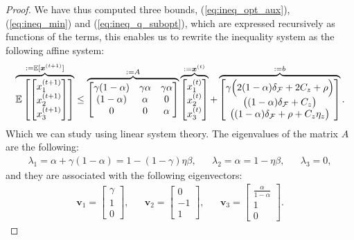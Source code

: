 \begin{proof}
    We have thus computed three bounds, (\ref{eq:ineq_opt_aux}), (\ref{eq:ineq_min}) and (\ref{eq:ineq_q_subopt}), which are expressed recursively as functions of the terms,
    this enables us to rewrite the inequality system as the following affine system:
    \begin{align}
        \label{eq:affine_system}
        \overbrace{ \mathbb{E} \begin{bmatrix}\begin{bmatrix}
            x_1^{(t+1)}\\
            x_2^{(t+1)}\\
            x_3^{(t+1)} 
        \end{bmatrix} \end{bmatrix} }^{:=\mathbb{E}[\bm{x}^{(t+1)}]}
        \leq 
        \overbrace{
            \begin{bmatrix}
                \gamma (1-\alpha) & \gamma \alpha &  \gamma \alpha \\
                 (1-\alpha) & \alpha & 0 \\
                 0 & 0 & \alpha 
            \end{bmatrix}
            }^{:=A}
        \overbrace{\begin{bmatrix}
            x_1^{(t)}\\
            x_2^{(t)}\\
            x_3^{(t)}
        \end{bmatrix}}^{:=\bm{x}^{(t)}}+
        \overbrace{
        \begin{bmatrix}
            \gamma \Bigl(  2(1-\alpha)\delta_\mathcal{F}+2C_z +\rho \Bigr)\\
            \bigl( (1-\alpha) \delta_\mathcal{F} + C_z\bigr) \\
            \bigl((1-\alpha) \delta_\mathcal{F} + \rho + C_z \eta_z \bigr)
        \end{bmatrix}}^{:=b}.
    \end{align}
    Which we can study using linear system theory. The eigenvalues of the matrix $A$ are the following:
    \begin{align*}
        \lambda_1 = \alpha + \gamma (1-\alpha) = 1 - (1-\gamma)\eta\beta, && 
        \lambda_2 = \alpha = 1-\eta\beta, && 
        \lambda_3 = 0,
    \end{align*}
    and they are associated with the following eigenvectors:
    \begin{align*}
        \bm{v}_1 = \begin{bmatrix}
            \gamma \\ 1 \\ 0
        \end{bmatrix}, &&
        \bm{v}_2 = \begin{bmatrix}
            0 \\ -1 \\ 1
        \end{bmatrix}, &&
        \bm{v}_3 = \begin{bmatrix}
            \frac{\alpha}{1 - \alpha} \\ 1 \\ 0
        \end{bmatrix}.
    \end{align*}


\end{proof}
